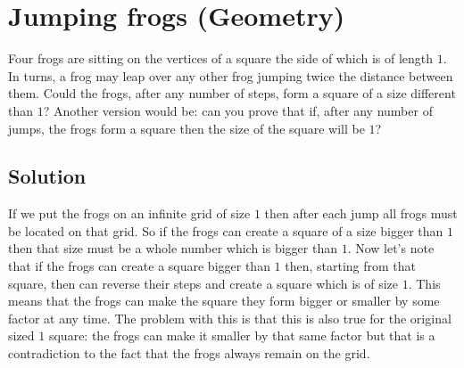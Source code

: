 \section{Jumping frogs (Geometry)}
Four frogs are sitting on the vertices of a square the side of which is of length $1$. In turns, a frog may leap over any other frog jumping twice the distance between them. Could the frogs, after any number of steps, form a square of a size different than $1$? Another version would be: can you prove that if, after any number of jumps, the frogs form a square then the size of the square will be $1$?

\subsection{Solution}
If we put the frogs on an infinite grid of size $1$ then after each jump all frogs must be located on that grid. So if the frogs can create a square of a size bigger than $1$ then that size must be a whole number which is bigger than $1$. Now let's note that if the frogs can create a square bigger than $1$ then, starting from that square, then can reverse their steps and create a square which is of size $1$. This means that the frogs can make the square they form bigger or smaller by some factor at any time. The problem with this is that this is also true for the original sized $1$ square: the frogs can make it smaller by that same factor but that is a contradiction to the fact that the frogs always remain on the grid.
